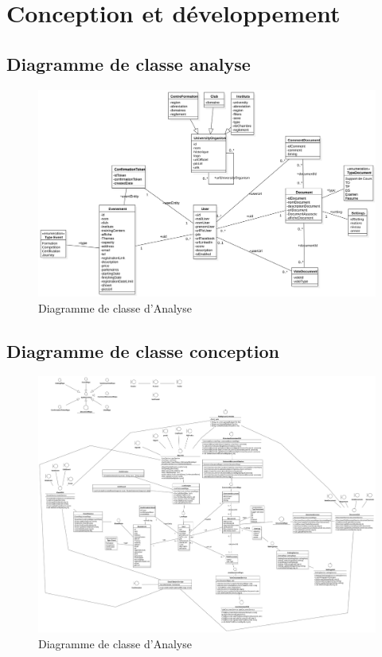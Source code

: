 \documentclass[12pt]{report}
\begin{document}
\chapter{Conception et développement}

\section{Diagramme de classe analyse}

\begin{figure}[h]
    \centering
    \includegraphics[width=1.2\textwidth]{AnalyseClassDiagram}
    \caption{Diagramme de classe d'Analyse}
    \label{fig:mesh6}
\end{figure}
\newpage


\section{Diagramme de classe conception}

\begin{figure}[h]
    \centering
    \includegraphics[width=1.2\textwidth]{Diagrammedeclasseconcpetion}
    \caption{Diagramme de classe d'Analyse}
    \label{fig:mesh6}
\end{figure}
\newpage
\end{document}
